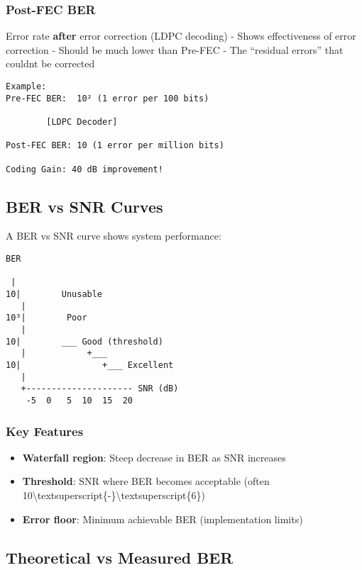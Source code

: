 \subsubsection{Post-FEC BER}\label{post-fec-ber}

Error rate \textbf{after} error correction (LDPC decoding) - Shows
effectiveness of error correction - Should be much lower than Pre-FEC -
The ``residual errors'' that couldn\textquotesingle t be corrected

\begin{verbatim}
Example:
Pre-FEC BER:  10² (1 error per 100 bits)
              
        [LDPC Decoder]
              
Post-FEC BER: 10 (1 error per million bits)

Coding Gain: 40 dB improvement! 
\end{verbatim}

\subsection{BER vs SNR Curves}\label{ber-vs-snr-curves}

A BER vs SNR curve shows system performance:

\begin{verbatim}
BER
 
 |         
10|        Unusable
   |        
10³|        Poor
   |      
10|        ___ Good (threshold)
   |            +___
10|                +___ Excellent
   |
   +--------------------- SNR (dB)
    -5  0   5  10  15  20
\end{verbatim}

\subsubsection{Key Features}\label{key-features}

\begin{itemize}
\tightlist
\item
  \textbf{Waterfall region}: Steep decrease in BER as SNR increases
\item
  \textbf{Threshold}: SNR where BER becomes acceptable (often
  10\textbackslash textsuperscript\{-\}\textbackslash textsuperscript\{6\})
\item
  \textbf{Error floor}: Minimum achievable BER (implementation limits)
\end{itemize}

\subsection{Theoretical vs Measured
BER}\label{theoretical-vs-measured-ber}

